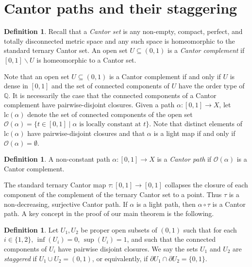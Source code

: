 \documentclass[12pt, leqno]{amsart}
\newcommand{\ui}{[0,1]}
\newcommand{\mco}{\mathcal{O}}
\newcommand{\bbq}{\mathbb{Q}}
\newcommand{\lc}{\text{lc}}
\theoremstyle{definition}\newtheorem{definition}[theorem]{Definition}
\begin{document}
\section{Cantor paths and their staggering}\label{sec: Canor paths}
%
\begin{definition}
 Recall that a \emph{Cantor set} is any non-empty, compact, perfect, and totally disconnected metric space and any such space is homeomorphic to the standard ternary Cantor set.  An open set $U\subseteq (0,1)$ is a \textit{Cantor complement} if $\ui\backslash U$ is homeomorphic to a Cantor set.
\end{definition}

Note that an open set $U\subseteq (0,1)$ is a Cantor complement if and only if $U$ is dense in $\ui$ and the set of connected components of $U$ have the order type of $\bbq$. It is necessarily the case that the connected components of a Cantor complement have pairwise-disjoint closures. Given a path $\alpha:\ui\to X$, let $\lc(\alpha)$ denote the set of connected components of the open set $\mco(\alpha)=\{t\in\ui\mid \alpha\text{ is locally constant at }t\}$. Note that distinct elements of $\lc(\alpha)$ have pairwise-disjoint closures and that $\alpha$ is a light map if and only if $\mco(\alpha)=\emptyset$.

\begin{definition}
A non-constant path $\alpha:\ui\to X$ is a \textit{Cantor path} if $\mco(\alpha)$ is a Cantor complement.
\end{definition}

The standard ternary Cantor map $\tau:\ui\to\ui$ collapses the closure of each component of the complement of the ternary Cantor set to a point. Thus $\tau$ is a non-decreasing, surjective Cantor path. If $\alpha$ is a light path, then $\alpha\circ \tau$ is a Cantor path. A key concept in the proof of our main theorem is the following.

\begin{definition}\label{staggereddef}
Let $U_1,U_2$ be proper open subsets of $(0,1)$ such that for each $i\in\{1,2\}$, $\inf(U_i)=0$, $\sup(U_i)=1$, and such that the connected components of $U_i$ have pairwise disjoint closures. We say the sets $U_1$ and $U_2$ are \textit{staggered} if $U_1\cup U_2=(0,1)$, or equivalently, if $\partial U_1\cap \partial U_2=\{0,1\}$.
\end{definition}
\end{document}
